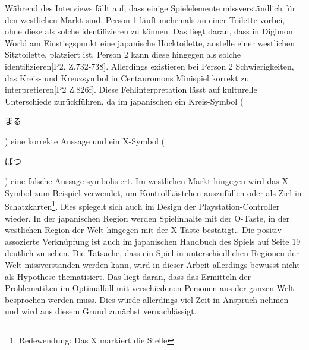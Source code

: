 Während des Interviews fällt auf, dass einige Spielelemente missverständlich für den westlichen Markt sind. Person 1 läuft mehrmals an einer Toilette vorbei, ohne diese als solche identifizieren zu können. Das liegt daran, dass  in Digimon World am Einstiegspunkt eine japanische Hocktoilette, anstelle einer westlichen Sitztoilette, platziert ist. Person 2 kann diese hingegen als solche identifizieren[P2, Z.732-738]. Allerdings existieren bei Person 2 Schwierigkeiten, das Kreis- und Kreuzsymbol in Centauromons Minispiel korrekt zu interpretieren[P2 Z.826f]. Diese Fehlinterpretation lässt auf kulturelle Unterschiede zurückführen, da im japanischen ein Kreis-Symbol (\begin{CJK}{UTF8}{min}まる\end{CJK}) eine korrekte Aussage und ein X-Symbol (\begin{CJK}{UTF8}{min}ばつ\end{CJK}) eine falsche Aussage symbolisiert\cite{intermediate-japanese}. Im westlichen Markt hingegen wird das X-Symbol zum Beispiel verwendet, um Kontrollkästchen auszufüllen oder als Ziel in Schatzkarten\footnote{Redewendung: \glqq Das X markiert die Stelle\grqq}. Dies spiegelt sich auch im Design der Playstation-Controller wieder. In der japanischen Region werden Spielinhalte mit der O-Taste, in der westlichen Region der Welt hingegen mit der X-Taste bestätigt.\cite{controller-japanese}. Die positiv assozierte Verknüpfung ist auch im japanischen Handbuch des Spiels auf Seite 19 deutlich zu sehen. Die Tatsache, dass ein Spiel in unterschiedlichen Regionen der Welt missverstanden werden kann, wird in dieser Arbeit allerdings bewusst nicht als Hypothese thematisiert. Das liegt daran, dass das Ermitteln der Problematiken im Optimalfall mit verschiedenen Personen aus der ganzen Welt besprochen werden muss. Dies würde allerdings viel Zeit in Anspruch nehmen und wird aus diesem Grund zunächst vernachlässigt.\\


